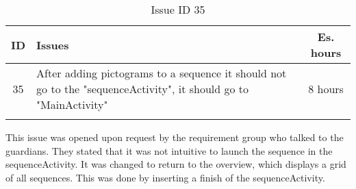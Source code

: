 \begin{longtable} { | c | p{12cm} | c | } 
\hline
	ID 	&	Issues	&		 Es. hours \\\hline
	35 	&	After adding pictograms to a sequence it should not go to the "sequenceActivity", it should go to "MainActivity"	&	8 hours \\\hline
\caption{Issue ID 35}
\label{tab:spr2_returntooverview}
\end{longtable}

This issue was opened upon request by the requirement group who talked to the guardians. They stated that it was not intuitive to launch the sequence in the sequenceActivity. It was changed to return to the overview, which displays a grid of all sequences. This was done by inserting a finish of the sequenceActivity.